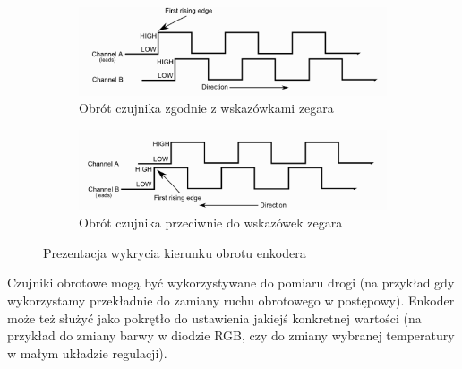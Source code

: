 \documentclass[11pt, a4paper]{article}
\begin{document}
\vspace{0.5cm}
\begin{figure}[h]
\centering
\begin{subfigure}{.5\textwidth}
  \centering
  \includegraphics[width=.78\linewidth]{fig/obrazki/zasada_dzialania/opis1.png}  
  \caption{Obrót czujnika zgodnie z wskazówkami zegara}
  \label{fig:sub1}
\end{subfigure}%
\begin{subfigure}{.5\textwidth}
  \centering
  \includegraphics[width=.8\linewidth]{fig/obrazki/zasada_dzialania/opis2.png}
  \caption{Obrót czujnika przeciwnie do wskazówek zegara}
  \label{fig:sub2}
\end{subfigure}
\caption{Prezentacja wykrycia kierunku obrotu enkodera}
\label{fig:test}
\end{figure}
\vspace{0.5cm}

Czujniki obrotowe mogą być wykorzystywane do pomiaru drogi (na przykład gdy wykorzystamy przekładnie do zamiany ruchu obrotowego w postępowy). Enkoder może też służyć jako pokrętło do ustawienia jakiejś konkretnej wartości (na przykład do zmiany barwy w diodzie RGB, czy do zmiany wybranej temperatury w małym układzie regulacji).


\newpage




\end{document}
